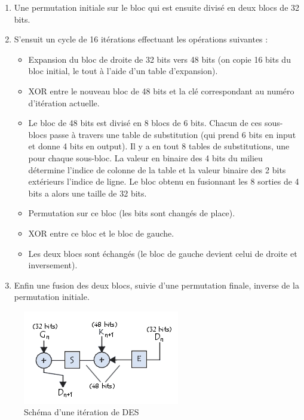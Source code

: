 \documentclass[a4paper,12pt]{article}
\begin{document}
\begin{enumerate}
\item Une permutation initiale sur le bloc qui est ensuite divisé en deux blocs de 32 bits.

\item S'ensuit un cycle de 16 itérations effectuant les opérations suivantes :
\begin{itemize}
\item Expansion du bloc de droite de 32 bits vers 48 bits (on copie 16 bits du bloc initial, le tout à l'aide d'un table d'expansion). 
\item XOR entre le nouveau bloc de 48 bits et la clé correspondant au numéro d'itération actuelle.
\item Le bloc de 48 bits est divisé en 8 blocs de 6 bits. Chacun de ces sous-blocs passe à travers une table de substitution (qui prend 6 bits en input et donne 4 bits en output). Il y a en tout 8 tables de substitutions, une pour chaque sous-bloc. La valeur en binaire des 4 bits du milieu détermine l'indice de colonne de la table et la valeur binaire des 2 bits extérieurs l'indice de ligne. Le bloc obtenu en fusionnant les 8 sorties de 4 bits a alors une taille de 32 bits.
\item Permutation sur ce bloc (les bits sont changés de place).
\item XOR entre ce bloc et le bloc de gauche.
\item Les deux blocs sont échangés (le bloc de gauche devient celui de droite et inversement).
\end{itemize}


\item Enfin une fusion des deux blocs, suivie d'une permutation finale, inverse de la permutation initiale.
\end{enumerate}

\begin{figure}[h]
\centering
\includegraphics[scale=0.80]{./images/DES_round.png}
\caption{Schéma d'une itération de DES}
\label{fig:DES-round}
\end{figure}
\end{document}
